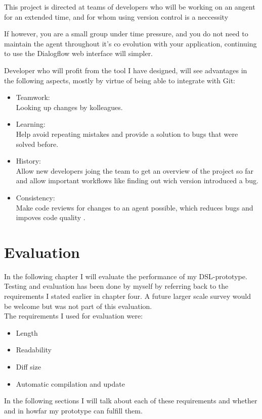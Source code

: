 This project is directed at teams of developers who will be working on an angent for an extended time, and for whom using version control is a neccessity

If however, you are a small group under time pressure, and you do not need to maintain the agent throughout it's co evolution with your application, continuing to use the Dialogflow web interface will simpler.

Developer who will profit from the tool I have designed, will see advantages in the following aspects, mostly by virtue of being able to integrate with Git:
\begin{itemize}
    \item Teamwork: \\ Looking up changes by kolleagues.
    \item Learning: \\ Help avoid repeating mistakes and provide a solution to bugs that were solved before.
    \item History: \\ Allow new developers joing the team to get an overview of the project so far and allow important workflows like finding out wich version introduced a bug.
    \item Consistency: \\ Make code reviews for changes to an agent possible, which reduces bugs and impoves code quality \citeNeeded.
\end{itemize}

\chapter{Evaluation}
In the following chapter I will evaluate the performance of my DSL-prototype.
Testing and evaluation has been done by myself by referring back to the requirements I stated earlier in chapter four. A future larger scale survey would be welcome but was not part of this evaluation.\\
The requirements I used for evaluation were:
\begin{itemize}
    \item Length
    \item Readability
    \item Diff size
    \item Automatic compilation and update
\end{itemize}

In the following sections I will talk about each of these requirements and whether and in howfar my prototype can fulfill them.

